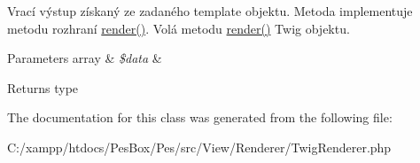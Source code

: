 Vrací výstup získaný ze zadaného template objektu. Metoda implementuje metodu rozhraní \mbox{\hyperlink{class_pes_1_1_view_1_1_renderer_1_1_twig_renderer_a09fbe510a869ecd4b71980fa5747ba39}{render()}}. Volá metodu \mbox{\hyperlink{class_pes_1_1_view_1_1_renderer_1_1_twig_renderer_a09fbe510a869ecd4b71980fa5747ba39}{render()}} Twig objektu.


\begin{DoxyParams}[1]{Parameters}
array & {\em \$data} & \\
\hline
\end{DoxyParams}
\begin{DoxyReturn}{Returns}
type 
\end{DoxyReturn}


The documentation for this class was generated from the following file\+:\begin{DoxyCompactItemize}
\item 
C\+:/xampp/htdocs/\+Pes\+Box/\+Pes/src/\+View/\+Renderer/Twig\+Renderer.\+php\end{DoxyCompactItemize}
